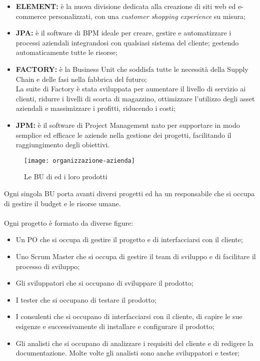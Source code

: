 \begin{itemize}
  \item \textbf{ELEMENT:} è la nuova divisione dedicata alla creazione di siti web ed e-commerce personalizzati, con una \textit{customer shopping experience} su misura;
  \item \textbf{JPA:} è il software di \gls{BPM} ideale per creare, gestire e automatizzare i processi aziendali integrandosi con qualsiasi sistema del cliente; gestendo automaticamente tutte le risorse;
  \item \textbf{FACTORY:} è la Business Unit che soddisfa tutte le necessità della \gls{Supply Chain} e delle fasi nella fabbrica del futuro;\\
  La suite di Factory è stata sviluppata per aumentare il livello di servizio ai clienti, ridurre i livelli di scorta di magazzino, ottimizzare l’utilizzo degli asset aziendali e massimizzare i profitti, riducendo i costi;
  \item \textbf{JPM:} è il software di \gls{Project Management} nato per supportare in modo semplice ed efficace le aziende nella gestione dei progetti, facilitando il raggiungimento degli obiettivi.

\end{itemize}


\begin{figure}[!h] 
  \centering 
  \texttt{[image: organizzazione-azienda]} 
  \caption{Le BU di {\azienda} ed i loro prodotti}
  \label{fig:organizzazione-azienda}
\end{figure}

\noindent Ogni singola BU porta avanti diversi progetti ed ha un responsabile che si occupa di gestire il budget e le risorse umane. \\
\\
Ogni progetto è formato da diverse figure:
\begin{itemize}
  \item Un \gls{PO} che si occupa di gestire il progetto e di interfacciarsi con il cliente;
  \item Uno \gls{Scrum Master} che si occupa di gestire il team di sviluppo e di facilitare il processo di sviluppo;
  \item Gli sviluppatori che si occupano di sviluppare il prodotto;
  \item I tester che si occupano di testare il prodotto;
  \item I consulenti che si occupano di interfacciarsi con il cliente, di capire le sue esigenze e successivamente di installare e configurare il prodotto;
  \item Gli \gls{analisti} che si occupano di analizzare i requisiti del cliente e di redigere la documentazione. Molte volte gli analisti sono anche sviluppatori e tester;
\end{itemize}

